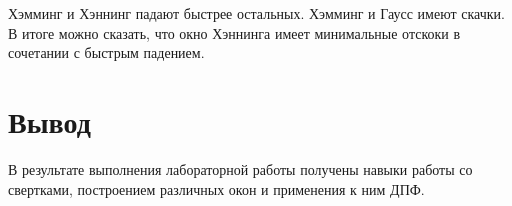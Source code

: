 \documentclass[a4paper,12pt]{article}
\begin{document}
\begin{enumerate}
\begin{enumerate}
			Хэмминг и Хэннинг падают быстрее остальных.
			Хэмминг и Гаусс имеют скачки.
			В итоге можно сказать, что окно Хэннинга имеет минимальные отскоки в сочетании с быстрым падением.
		
		\end{enumerate}
		
		\section{Вывод}
		
		В результате выполнения лабораторной работы получены навыки работы со свертками, построением различных окон и применения к ним ДПФ.
		
	\end{enumerate}
	
\end{document}
